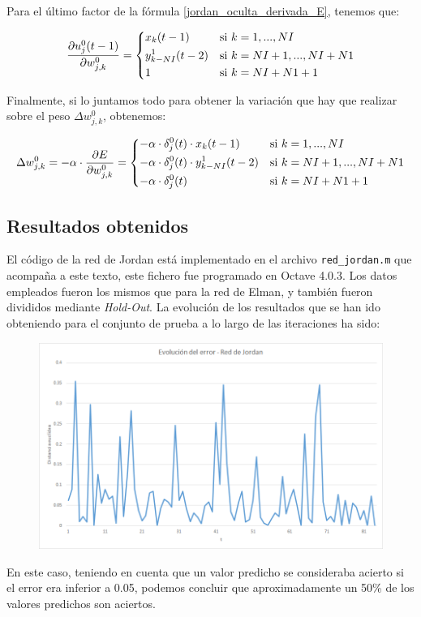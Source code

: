\documentclass[a4paper,11pt]{article}
\begin{document}
Para el último factor de la fórmula \ref{jordan_oculta_derivada_E}, tenemos que:

\begin{equation}
	\frac{\partial u_{j}^{0}(t-1)}{\partial w_{j,k}^{0}} =
	\begin{dcases}
		x_{k}(t-1)			& \textrm{si } k=1,...,NI\\
		y_{k-NI}^{1}(t-2)	& \textrm{si } k=NI+1,...,NI+N1\\
		1					& \textrm{si } k=NI+N1+1
	\end{dcases}
\end{equation}

Finalmente, si lo juntamos todo para obtener la variación que hay que realizar sobre el peso ${\Delta w_{j,k}^{0}}$, obtenemos:

\begin{equation}
	\Delta w_{j,k}^{0} = -\alpha \cdot \frac{\partial E}{\partial w_{j,k}^{0}} =
    \begin{dcases}
		-\alpha \cdot \delta_{j}^{0}(t) \cdot x_{k}(t-1)
        	& \textrm{si } k=1,...,NI\\
		-\alpha \cdot \delta_{j}^{0}(t) \cdot y_{k-NI}^{1}(t-2)
        	& \textrm{si } k=NI+1,...,NI+N1\\
		-\alpha \cdot \delta_{j}^{0}(t)
        	& \textrm{si } k=NI+N1+1
	\end{dcases}
\end{equation}

\subsection{Resultados obtenidos}
El código de la red de Jordan está implementado en el archivo \texttt{red\_jordan.m} que acompaña a este texto, este fichero fue programado en Octave 4.0.3. Los datos empleados fueron los mismos que para la red de Elman, y también fueron divididos mediante \textit{Hold-Out}. La evolución de los resultados que se han ido obteniendo para el conjunto de prueba a lo largo de las iteraciones ha sido:

\begin{figure}[!htbp]
	\centering
	\includegraphics[width=1.0\textwidth]{red_jordan_error.png}
\end{figure}

En este caso, teniendo en cuenta que un valor predicho se consideraba acierto si el error era inferior a 0.05, podemos concluir que aproximadamente un 50\% de los valores predichos son aciertos.
\end{document}
